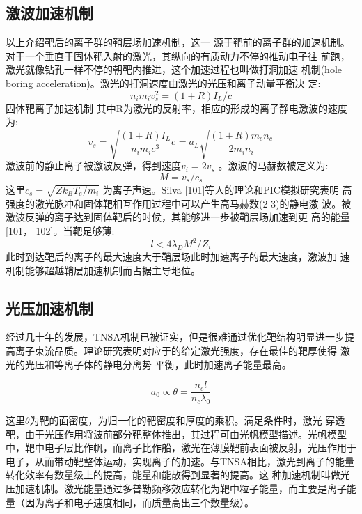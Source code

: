 \subsection {激波加速机制}
以上介绍靶后的离子群的鞘层场加速机制，这一
源于靶前的离子群的加速机制。
对于一个垂直于固体靶入射的激光，其纵向的有质动力不停的推动电子往
前跑，激光就像钻孔一样不停的朝靶内推进，这个加速过程也叫做打洞加速
机制(hole boring acceleration)。激光的打洞速度由激光的光压和离子动量平衡决
定:
\begin{equation}
\label{eqn:holeboringEqualibrium}
n_i m_i v_s^2 = (1 + R)I_L /c
\end{equation}
固体靶离子加速机制
其中R为激光的反射率，相应的形成的离子静电激波的速度为:
\begin{equation}
\label{eqn:shockVelocity}
v_s=\sqrt{\frac{(1+R)I_L}{n_i m_i c^3}c}= a_L\sqrt{\frac{(1+R)m_e n_c}{2m_i n_i}}
\end{equation}
激波前的静止离子被激波反弹，得到速度$v_i = 2v_s$ 。激波的马赫数被定义为:
\begin{equation}
\label{machDefine}
M = v_s /c_s
\end{equation}
这里$c_s =\sqrt{Zk_B T_e/ m_i}$ 为离子声速。Silva [101]等人的理论和PIC模拟研究表明
高强度的激光脉冲和固体靶相互作用过程中可以产生高马赫数(2-3)的静电激
波。被激波反弹的离子达到固体靶后的时候，其能够进一步被鞘层场加速到更
高的能量 [101， 102]。当靶足够薄:
\begin{equation}
\label{eqn:thickLimit}
l < 4 \lambda_D M^2/Z_i
\end{equation}
此时到达靶后的离子的最大速度大于鞘层场此时加速离子的最大速度，激波加
速机制能够超越鞘层加速机制而占据主导地位。


\subsection{光压加速机制}

经过几十年的发展，TNSA机制已被证实，但是很难通过优化靶结构明显进一步提高离子束流品质。理论研究表明对应于的给定激光强度，存在最佳的靶厚使得
激光的光压和等离子体的静电分离势
平衡\cite{esirkepov2006laser,yan2008generating,macchi2009light}，此时加速离子能量最高。

\begin{equation}
\label{eqn:separation_potential}
a_0 \propto \theta = \frac{n_e l}{n_c {\lambda}_0}
\end{equation}     


这里$\theta$为靶的面密度，为归一化的靶密度和厚度的乘积。满足条件时，激光
穿透靶，由于光压作用将波前部分靶整体推出，其过程可由光帆模型描述。光帆模型中，靶中电子层比作帆，而离子比作船，激光在薄膜靶前表面被反射，光压作用于电子，从而带动靶整体运动，实现离子的加速。与TNSA相比，激光到离子的能量转化效率有数量级上的提高，能量和能散得到显著的提高。这
种加速机制叫做光压加速机制。激光能量通过多普勒频移效应转化为靶中粒子能量，而主要是离子能量（因为离子和电子速度相同，而质量高出三个数量级）。


